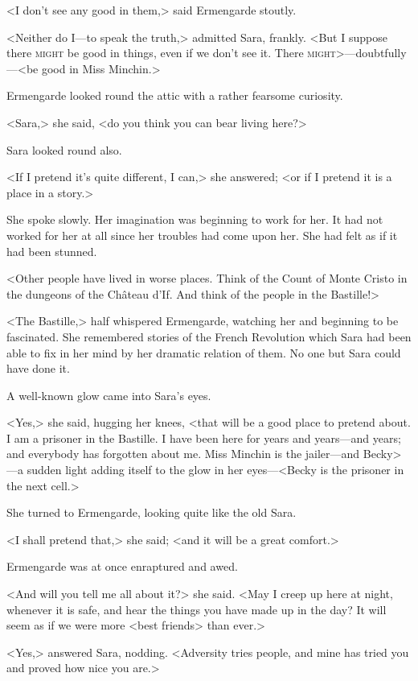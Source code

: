 <I don't see any good in them,> said Ermengarde stoutly.

<Neither do I—to speak the truth,> admitted Sara, frankly. <But I suppose there \textsc{might} be good in things, even if we don't see it. There \textsc{might}>—doubtfully—<be good in Miss Minchin.>

Ermengarde looked round the attic with a rather fearsome curiosity.

<Sara,> she said, <do you think you can bear living here?>

Sara looked round also.

<If I pretend it's quite different, I can,> she answered; <or if I pretend it is a place in a story.>

She spoke slowly. Her imagination was beginning to work for her. It had not worked for her at all since her troubles had come upon her. She had felt as if it had been stunned.

<Other people have lived in worse places. Think of the Count of Monte Cristo in the dungeons of the Château d'If. And think of the people in the Bastille!>

<The Bastille,> half whispered Ermengarde, watching her and beginning to be fascinated. She remembered stories of the French Revolution which Sara had been able to fix in her mind by her dramatic relation of them. No one but Sara could have done it.

A well-known glow came into Sara's eyes.

<Yes,> she said, hugging her knees, <that will be a good place to pretend about. I am a prisoner in the Bastille. I have been here for years and years—and years; and everybody has forgotten about me. Miss Minchin is the jailer—and Becky>—a sudden light adding itself to the glow in her eyes—<Becky is the prisoner in the next cell.>

She turned to Ermengarde, looking quite like the old Sara.

<I shall pretend that,> she said; <and it will be a great comfort.>

Ermengarde was at once enraptured and awed.

<And will you tell me all about it?> she said. <May I creep up here at night, whenever it is safe, and hear the things you have made up in the day? It will seem as if we were more <best friends> than ever.>

<Yes,> answered Sara, nodding. <Adversity tries people, and mine has tried you and proved how nice you are.>